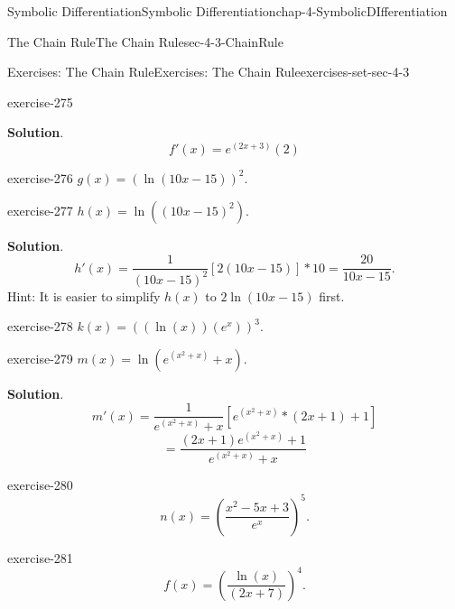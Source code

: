 \documentclass[oneside,10pt,]{book}
\numberwithin{equation}{section}
\begin{document}
\begin{chapterptx}{Symbolic Differentiation}{}{Symbolic Differentiation}{}{}{chap-4-SymbolicDIfferentiation}
\begin{sectionptx}{The Chain Rule}{}{The Chain Rule}{}{}{sec-4-3-ChainRule}
\begin{exercises-subsection-numberless}{Exercises: The Chain Rule}{}{Exercises: The Chain Rule}{}{}{exercises-set-sec-4-3}
\begin{divisionexercise}{7}{}{}{exercise-275}
\par\smallskip%
\noindent\textbf{Solution}.\hypertarget{solution-137}{}\quad%
%
\begin{equation*}
f'(x)=e^(2x+3)  (2)
\end{equation*}
\end{divisionexercise}%
\begin{divisionexercise}{8}{}{}{exercise-276}%
\hypertarget{p-1671}{}%
\(g(x)=(\ln(10x-15))^2\).%
\end{divisionexercise}%
\begin{divisionexercise}{9}{}{}{exercise-277}%
\hypertarget{p-1672}{}%
\(h(x)=\ln((10x-15)^2)\).%
\par\smallskip%
\noindent\textbf{Solution}.\hypertarget{solution-138}{}\quad%
%
\begin{equation*}
h'(x)=\frac{1}{(10x-15)^2}[2(10x-15)]*10
=\frac{20}{10x-15}.
\end{equation*}
\hypertarget{p-1673}{}%
Hint:  It is easier to simplify \(h(x)\) to \(2\ln(10x-15)\) first.%
\end{divisionexercise}%
\begin{divisionexercise}{10}{}{}{exercise-278}%
\hypertarget{p-1674}{}%
\(k(x)=((\ln(x))(e^x))^3\).%
\end{divisionexercise}%
\begin{divisionexercise}{11}{}{}{exercise-279}%
\hypertarget{p-1675}{}%
\(m(x)=\ln(e^{(x^2+x)}+x)\).%
\par\smallskip%
\noindent\textbf{Solution}.\hypertarget{solution-139}{}\quad%
%
\begin{equation*}
m'(x)=\frac{1}{e^{(x^2+x)}+x} [e^{(x^2+x)}*(2x+1)+1]
\end{equation*}
%
\begin{equation*}
=\frac{(2x+1) e^{(x^2+x)}+1}{e^{(x^2+x)}+x}
\end{equation*}
\end{divisionexercise}%
\begin{divisionexercise}{12}{}{}{exercise-280}%
\hypertarget{p-1676}{}%
%
\begin{equation*}
n(x)=\left(\frac{x^2-5x+3}{e^x }\right)^5\text{.}
\end{equation*}
%
\end{divisionexercise}%
\begin{divisionexercise}{13}{}{}{exercise-281}%
\hypertarget{p-1677}{}%
%
\begin{equation*}
f(x)=\left(\frac{\ln(x)}{(2x+7)}\right)^4\text{.}
\end{equation*}
%
\par\smallskip%

\end{divisionexercise}
\end{exercises-subsection-numberless}
\end{sectionptx}
\end{chapterptx}
\end{document}

